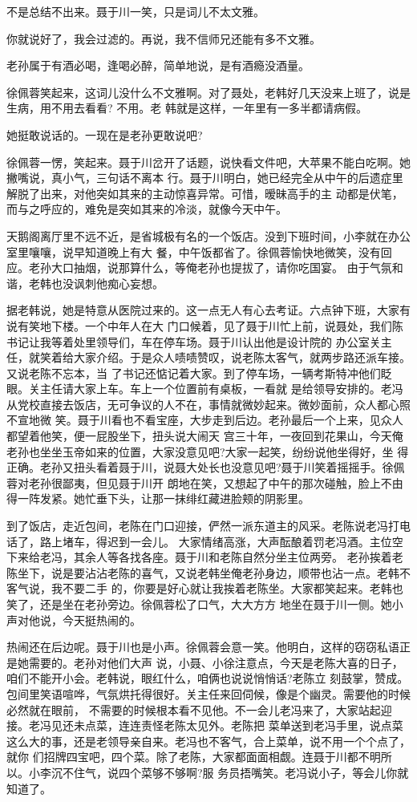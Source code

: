 \documentclass[11pt,a4paper,onecolumn]{article}
\begin{document}
不是总结不出来。聂于川一笑，只是词儿不太文雅。

你就说好了，我会过滤的。再说，我不信师兄还能有多不文雅。

老孙属于\myrule{}有酒必喝，逢喝必醉，简单地说，是有酒瘾没酒量。

徐佩蓉笑起来，这词儿没什么不文雅啊。对了聂处，老韩好几天没来上班了，说是生病，用不用去看看? 不用。老
韩就是这样，一年里有一多半都请病假。

她挺敢说话的。一现在是老孙更敢说吧?

徐佩蓉一愣，笑起来。聂于川岔开了话题，说快看文件吧，大苹果不能白吃啊。她撇嘴说，真小气，三句话不离本
行。聂于川明白，她已经完全从中午的后遗症里解脱了出来，对他突如其来的主动惊喜异常。可惜，暧昧高手的主
动都是伏笔，而与之呼应的，难免是突如其来的冷淡，就像今天中午。

天鹅阁离厅里不远不近，是省城极有名的一个饭店。没到下班时间，小李就在办公室里嚷嚷，说早知道晚上有大
餐，中午饭都省了。徐佩蓉愉快地微笑，没有回应。老孙大口抽烟，说那算什么，等俺老孙也提拔了，请你吃国宴。
由于气氛和谐，老韩也没讽刺他痴心妄想。

据老韩说，她是特意从医院过来的。这一点无人有心去考证。六点钟下班，大家有说有笑地下楼。一个中年人在大
门口候着，见了聂于川忙上前，说聂处，我们陈书记让我等着处里领导们，车在停车场。聂于川认出他是设计院的
办公室关主任，就笑着给大家介绍。于是众人啧啧赞叹，说老陈太客气，就两步路还派车接。又说老陈不忘本，当
了书记还惦记着大家。到了停车场，一辆考斯特冲他们眨眼。关主任请大家上车。车上一个位置前有桌板，一看就
是给领导安排的。老冯从党校直接去饭店，无可争议的人不在，事情就微妙起来。微妙面前，众人都心照不宣地微
笑。聂于川看也不看宝座，大步走到后边。老孙最后一个上来，见众人都望着他笑，便一屁股坐下，扭头说大闹天
宫三十年，一夜回到花果山，今天俺老孙也坐坐玉帝如来的位置，大家没意见吧?大家一起笑，纷纷说他坐得好，坐
得正确。老孙又扭头看着聂于川，说聂大处长也没意见吧?聂于川笑着摇摇手。徐佩蓉对老孙很鄙夷，但见聂于川开
朗地在笑，又想起了中午的那次碰触，脸上不由得一阵发紧。她忙垂下头，让那一抹绯红藏进脸颊的阴影里。

到了饭店，走近包间，老陈在门口迎接，俨然一派东道主的风采。老陈说老冯打电话了，路上堵车，得迟到一会儿。
大家情绪高涨，大声酝酿着罚老冯酒。主位空下来给老冯，其余人等各找各座。聂于川和老陈自然分坐主位两旁。
老孙挨着老陈坐下，说是要沾沾老陈的喜气，又说老韩坐俺老孙身边，顺带也沾一点。老韩不客气说，我不要二手
的，你要是好心就让我挨着老陈坐。大家都笑起来。老韩也笑了，还是坐在老孙旁边。徐佩蓉松了口气，大大方方
地坐在聂于川一侧。她小声对他说，今天挺热闹的。

热闹还在后边呢。聂于川也是小声。徐佩蓉会意一笑。他明白，这样的窃窃私语正是她需要的。老孙对他们大声
说，小聂、小徐注意点，今天是老陈大喜的日子，咱们不能开小会。老韩说，眼红什么，咱俩也说说悄悄话?老陈立
刻鼓掌，赞成。包间里笑语喧哗，气氛烘托得很好。关主任来回伺候，像是个幽灵。需要他的时候必然就在眼前，
不需要的时候根本看不见他。不一会儿老冯来了，大家站起迎接。老冯见还未点菜，连连责怪老陈太见外。老陈把
菜单送到老冯手里，说点菜这么大的事，还是老领导亲自来。老冯也不客气，合上菜单，说不用一个个点了，就你
们招牌四宝吧，四个菜。除了老陈，大家都面面相觑。连聂于川都不明所以。小李沉不住气，说四个菜够不够啊?服
务员捂嘴笑。老冯说小子，等会儿你就知道了。
\end{document}
